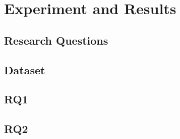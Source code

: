 \section{Experiment and Results}
\subsection{Research Questions}
\subsection{Dataset}
\subsection{RQ1}
\subsection{RQ2}
